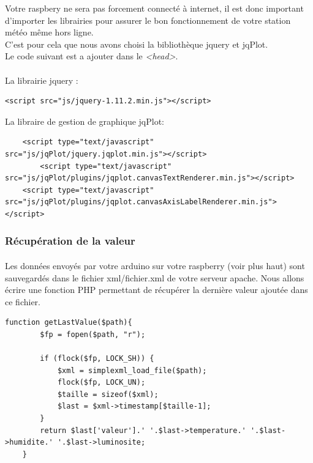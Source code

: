 \documentclass[a4paper, titlepage, oneside, 12pt]{article}%
\begin{document}
Votre raspbery ne sera pas forcement connecté à internet, il est donc important d'importer les librairies pour assurer le bon fonctionnement de votre station météo même hors ligne.\\
C'est pour cela que nous avons choisi la bibliothèque jquery et jqPlot.\\ Le code suivant est a ajouter dans le \textit{<head>}.
\paragraph{}
La librairie jquery :
\begin{lstlisting}
<script src="js/jquery-1.11.2.min.js"></script>	
\end{lstlisting}
La libraire de gestion de graphique jqPlot:
\begin{lstlisting}
	<script type="text/javascript" src="js/jqPlot/jquery.jqplot.min.js"></script>	
    	<script type="text/javascript" src="js/jqPlot/plugins/jqplot.canvasTextRenderer.min.js"></script>
	<script type="text/javascript" src="js/jqPlot/plugins/jqplot.canvasAxisLabelRenderer.min.js"></script>	
\end{lstlisting}

\subsubsection{Récupération de la valeur}
\paragraph{}
Les données envoyés par votre arduino sur votre raspberry (voir plus haut) sont sauvegardés dans le fichier xml/fichier.xml de votre serveur apache. Nous allons écrire une fonction PHP permettant de récupérer la dernière valeur ajoutée dans ce fichier.
\begin{lstlisting}
function getLastValue($path){
		$fp = fopen($path, "r");
		
		if (flock($fp, LOCK_SH)) {
			$xml = simplexml_load_file($path);
			flock($fp, LOCK_UN);
			$taille = sizeof($xml);
			$last = $xml->timestamp[$taille-1];	
		}
		return $last['valeur'].' '.$last->temperature.' '.$last->humidite.' '.$last->luminosite;
	}	
\end{lstlisting}
\end{document}
